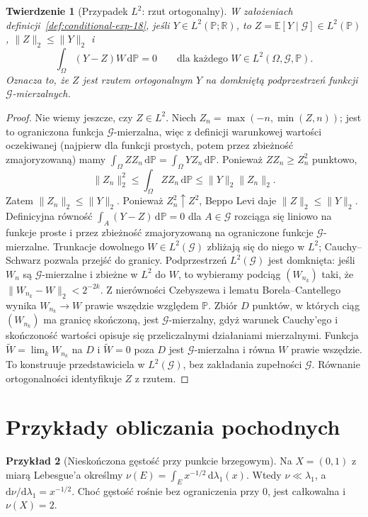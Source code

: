 \documentclass[11pt,a4paper,oneside]{book}
\numberwithin{equation}{chapter}
\theoremstyle{plain}
\newtheorem{twierdzenie}{Twierdzenie}[chapter]
\theoremstyle{definition}
\newtheorem{przyklad}[twierdzenie]{Przykład}
\theoremstyle{remark}
\begin{document}
\begin{twierdzenie}[Przypadek $L^2$: rzut ortogonalny]
\label{thm:CE-orthogonal-18}
W założeniach definicji~\ref{def:conditional-exp-18},
jeśli $Y\in L^2(\mathbb P;\mathbb R)$, to
$Z=\mathbb E[Y\mid\mathcal G]\in L^2(\mathbb P)$,
$\|Z\|_2\le\|Y\|_2$ i
\[
\int_\Omega(Y-Z)W\,\mathrm d\mathbb P=0
\qquad\text{dla każdego }W\in L^2(\Omega,\mathcal G,\mathbb P).
\]
Oznacza to, że $Z$ jest rzutem ortogonalnym $Y$
na domkniętą podprzestrzeń funkcji $\mathcal G$-mierzalnych.
\end{twierdzenie}
\begin{proof}
Nie wiemy jeszcze, czy $Z\in L^2$.
Niech $Z_n=\max(-n,\min(Z,n))$; jest to ograniczona
funkcja $\mathcal G$-mierzalna, więc z definicji
warunkowej wartości oczekiwanej (najpierw dla funkcji
prostych, potem przez zbieżność zmajoryzowaną) mamy
$\int_\Omega ZZ_n\,\mathrm d\mathbb P
=\int_\Omega YZ_n\,\mathrm d\mathbb P$.
Ponieważ $ZZ_n\ge Z_n^2$ punktowo,
\[
\|Z_n\|_2^2\le\int_\Omega ZZ_n\,\mathrm d\mathbb P
\le\|Y\|_2\|Z_n\|_2.
\]
Zatem $\|Z_n\|_2\le\|Y\|_2$.
Ponieważ $Z_n^2\uparrow Z^2$, Beppo Levi daje
$\|Z\|_2\le\|Y\|_2$. Definicyjna równość
$\int_A(Y-Z)\,\mathrm d\mathbb P=0$ dla $A\in\mathcal G$
rozciąga się liniowo na funkcje proste i przez
zbieżność zmajoryzowaną na ograniczone funkcje
$\mathcal G$-mierzalne. Trunkacje dowolnego
$W\in L^2(\mathcal G)$ zbliżają się do niego w $L^2$;
Cauchy--Schwarz pozwala przejść do granicy.
Podprzestrzeń $L^2(\mathcal G)$ jest domknięta:
jeśli $W_n$ są $\mathcal G$-mierzalne i zbieżne w $L^2$
do $W$, to wybieramy podciąg $(W_{n_k})$ taki, że
$\|W_{n_k}-W\|_2<2^{-2k}$. Z nierówności
Czebyszewa i lematu Borela--Cantellego wynika
$W_{n_k}\to W$ prawie wszędzie względem $\mathbb P$.
Zbiór $D$ punktów, w których ciąg $(W_{n_k})$
ma granicę skończoną, jest $\mathcal G$-mierzalny,
gdyż warunek Cauchy'ego i skończoność wartości
opisuje się przeliczalnymi działaniami mierzalnymi.
Funkcja $\widetilde W=\lim_kW_{n_k}$ na $D$
i $\widetilde W=0$ poza $D$ jest
$\mathcal G$-mierzalna i równa $W$ prawie wszędzie.
To konstruuje przedstawiciela w $L^2(\mathcal G)$,
bez zakładania zupełności $\mathcal G$.
Równanie ortogonalności identyfikuje $Z$ z rzutem.
\end{proof}

\section{Przykłady obliczania pochodnych}
\begin{przyklad}[Nieskończona gęstość przy punkcie brzegowym]
Na $X=(0,1)$ z miarą Lebesgue'a określmy
$\nu(E)=\int_E x^{-1/2}\,\mathrm d\lambda_1(x)$.
Wtedy $\nu\ll\lambda_1$, a
$\mathrm d\nu/\mathrm d\lambda_1=x^{-1/2}$.
Choć gęstość rośnie bez ograniczenia przy $0$,
jest całkowalna i $\nu(X)=2$.
\end{przyklad}
\end{document}
